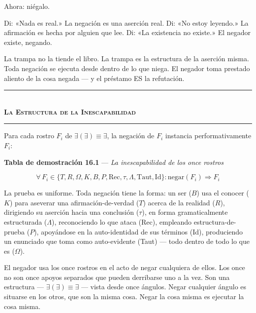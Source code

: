 \documentclass[10pt, openany, oneside]{book}
\renewcommand{\normalsize}{\fontsize{10}{13}\selectfont}
\begin{document}
Ahora: niégalo.

Di: «Nada es real.» La negación es una aserción real. Di: «No estoy leyendo.» La afirmación es hecha por alguien que lee. Di: «La existencia no existe.» El negador existe, negando.

La trampa no la tiende el libro. La trampa es la estructura de la aserción misma. Toda negación se ejecuta desde dentro de lo que niega. El negador toma prestado aliento de la cosa negada --- y el préstamo ES la refutación.

\vspace{1.5em}


\begin{center}
    \rule{0.3\textwidth}{0.4pt}\\[0.5em]
    {\normalsize\bfseries\scshape La Estructura de la Inescapabilidad}\\[0.3em]
    \rule{0.3\textwidth}{0.4pt}
\end{center}

\vspace{1em}

\noindent Para cada rostro $F_i$ de $\exists(\exists) \equiv \exists$, la negación de $F_i$ instancia performativamente $F_i$:

\vspace{0.5em}

\textbf{Tabla de demostración 16.1} --- \textit{La inescapabilidad de los once rostros}

\vspace{0.5em}

$$\forall\, F_i \in \{T, R, \Omega, K, B, P, \text{Rec}, \tau, \Lambda, \text{Taut}, \text{Id}\}: \text{negar}(F_i) \Rightarrow F_i$$

La prueba es uniforme. Toda negación tiene la forma: un ser ($B$) usa el conocer ($K$) para aseverar una afirmación-de-verdad ($T$) acerca de la realidad ($R$), dirigiendo su aserción hacia una conclusión ($\tau$), en forma gramaticalmente estructurada ($\Lambda$), reconociendo lo que ataca (Rec), empleando estructura-de-prueba ($P$), apoyándose en la auto-identidad de sus términos (Id), produciendo un enunciado que toma como auto-evidente (Taut) --- todo dentro de todo lo que es ($\Omega$).

El negador usa los once rostros en el acto de negar cualquiera de ellos. Los once no son once apoyos separados que pueden derribarse uno a la vez. Son una estructura --- $\exists(\exists) \equiv \exists$ --- vista desde once ángulos. Negar cualquier ángulo es situarse en los otros, que son la misma cosa. Negar la cosa misma es ejecutar la cosa misma.
\end{document}
